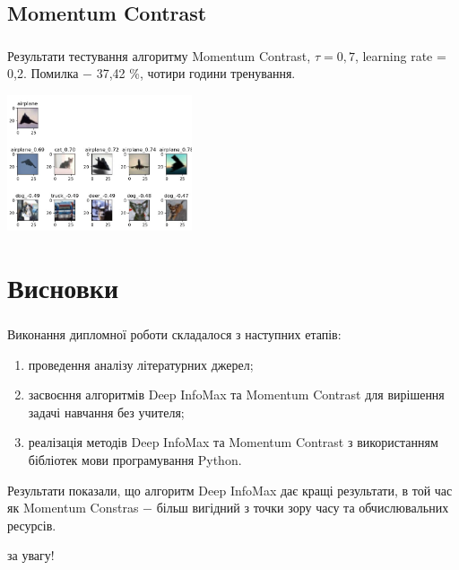 \documentclass[c]{beamer}
\begin{document}
\subsection{Momentum Contrast}

\begin{frame}
	\frametitle{\insertsection}
	\framesubtitle{\insertsubsection}

	Результати тестування алгоритму Momentum Contrast, $\tau = 0,7$, learning rate = 0,2. Помилка $-$ 37,42 \%, чотири години тренування.
	
    \includegraphics[width=\textwidth, height=4cm, natwidth=621, natheight=456]{mocodemo3.jpg}

\end{frame}

\section{Висновки}

\begin{frame}
	\frametitle{\insertsection}
	Виконання дипломної роботи складалося з наступних етапів:

	\begin{enumerate}
		\item проведення аналізу літературних джерел;\pause
		\item засвоєння алгоритмів Deep InfoMax та Momentum Contrast для вирішення задачі навчання без учителя;\pause
		\item реалізація методів Deep InfoMax та Momentum Contrast з використанням бібліотек мови програмування Python.\pause
	\end{enumerate}

	Результати показали, що алгоритм Deep InfoMax дає кращі результати, в той час як Momentum Constras $-$ більш вигідний з точки зору часу та обчислювальних ресурсів.
\end{frame}

\begin{frame}
	\centering{} за увагу!
\end{frame}
\end{document}
